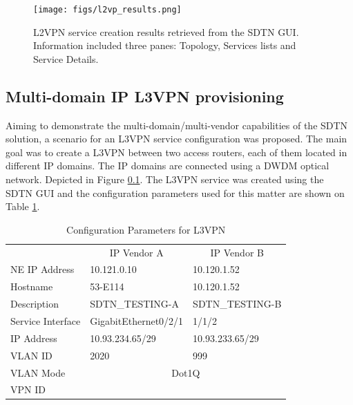 \documentclass[a4paper,fleqn]{cas-dc}
\begin{document}
\begin{figure}
	\centering
		\texttt{[image: figs/l2vp\_results.png]}
	\caption{L2VPN service creation results retrieved from the SDTN GUI. Information included three panes: Topology, Services lists and Service Details.}
	\label{FIG:L2SM_results}
\end{figure}


\subsection{Multi-domain IP L3VPN provisioning}

Aiming to demonstrate the multi-domain/multi-vendor capabilities of the SDTN solution, a scenario for an L3VPN service configuration was proposed. The main goal was to create a L3VPN between two access routers, each of them located in different IP domains. The IP domains are connected using a DWDM optical network. Depicted in Figure \ref{}. The L3VPN service was created using the SDTN GUI and the configuration parameters used for this matter are shown on Table \ref{TAB:discovered_ip_l3vpn}.


\begin{table}[]
\caption{Configuration Parameters for L3VPN}
\begin{adjustbox}{width=0.5\textwidth}
\small
\begin{tabular}{lll}
& \multicolumn{1}{c}{IP Vendor A} & \multicolumn{1}{c}{IP Vendor B} \\
{\color[HTML]{000000} NE IP Address} & {\color[HTML]{000000} 10.121.0.10}          & {\color[HTML]{000000} 10.120.1.52}     \\
\rowcolor[HTML]{F2F2F2} 
{\color[HTML]{000000} Hostname}            & {\color[HTML]{000000} 53-E114}              & {\color[HTML]{000000} 10.120.1.52}     \\
{\color[HTML]{000000} Description}         & {\color[HTML]{000000} SDTN\_TESTING-A}      & {\color[HTML]{000000} SDTN\_TESTING-B} \\
\rowcolor[HTML]{F2F2F2} 
{\color[HTML]{000000} Service   Interface} & {\color[HTML]{000000} GigabitEthernet0/2/1} & {\color[HTML]{000000} 1/1/2}           \\
{\color[HTML]{000000} IP Address}          & {\color[HTML]{000000} 10.93.234.65/29}      & {\color[HTML]{000000} 10.93.233.65/29} \\
\rowcolor[HTML]{F2F2F2} 
{\color[HTML]{000000} VLAN   ID}           & {\color[HTML]{000000} 2020}                 & {\color[HTML]{000000} 999}             \\
{\color[HTML]{000000} VLAN Mode}           & \multicolumn{2}{c}{{\color[HTML]{000000} Dot1Q}}                                     \\
\rowcolor[HTML]{F2F2F2} 
{\color[HTML]{000000} VPN   ID}            & \multicolumn{2}{c}{\cellcolor[HTML]{F2F2F2}{\color[HTML]{000000} 15}}           
\end{tabular}
\end{adjustbox}
\label{TAB:discovered_ip_l3vpn}
\end{table}
\end{document}
